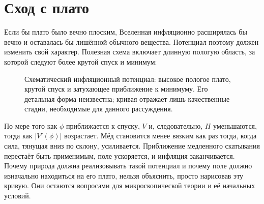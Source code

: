 \section{Сход с плато}

Если бы плато было вечно плоским, Вселенная инфляционно расширялась бы вечно и оставалась бы лишённой обычного вещества. Потенциал поэтому должен изменить свой характер. Полезная схема включает длинную пологую область, за которой следуют более крутой спуск и минимум:
\begin{figure}[htbp]
\centering
\begin{coursefitfigure}
\end{coursefitfigure}
\caption{Схематический инфляционный потенциал: высокое пологое плато, крутой спуск и затухающее приближение к минимуму. Его детальная форма неизвестна; кривая отражает лишь качественные стадии, необходимые для данного рассуждения.}
\label{fig:c09-inflation-potential}
\end{figure}

По мере того как \(\phi\) приближается к спуску, \(V\) и, следовательно, \(H\) уменьшаются, тогда как \(\lvert V'(\phi)\rvert\) возрастает. Мёд становится менее вязким как раз тогда, когда сила, тянущая вниз по склону, усиливается. Приближение медленного скатывания перестаёт быть применимым, поле ускоряется, и инфляция заканчивается. Почему природа должна реализовывать такой потенциал и почему поле должно изначально находиться на его плато, нельзя объяснить, просто нарисовав эту кривую. Они остаются вопросами для микроскопической теории и её начальных условий.

